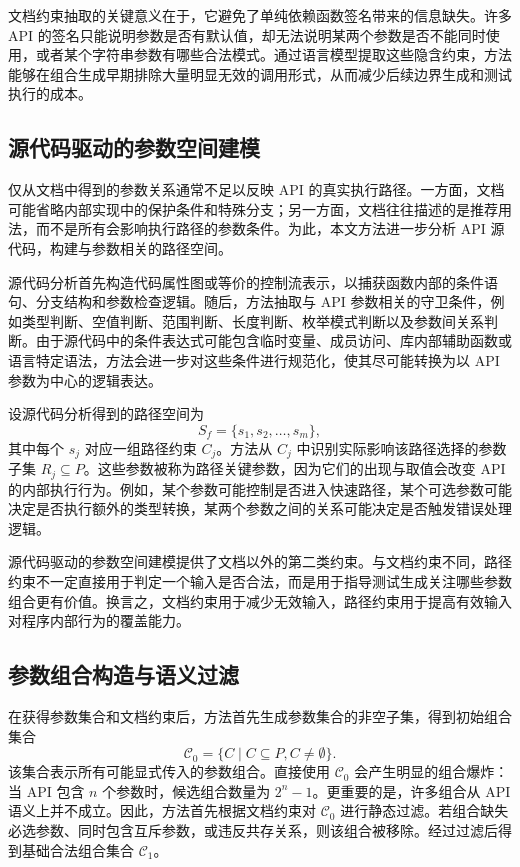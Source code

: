 \documentclass[UTF8,fontset=fandol]{ctexart}
\begin{document}
文档约束抽取的关键意义在于，它避免了单纯依赖函数签名带来的信息缺失。许多 API 的签名只能说明参数是否有默认值，却无法说明某两个参数是否不能同时使用，或者某个字符串参数有哪些合法模式。通过语言模型提取这些隐含约束，方法能够在组合生成早期排除大量明显无效的调用形式，从而减少后续边界生成和测试执行的成本。

\subsection{源代码驱动的参数空间建模}

仅从文档中得到的参数关系通常不足以反映 API 的真实执行路径。一方面，文档可能省略内部实现中的保护条件和特殊分支；另一方面，文档往往描述的是推荐用法，而不是所有会影响执行路径的参数条件。为此，本文方法进一步分析 API 源代码，构建与参数相关的路径空间。

源代码分析首先构造代码属性图或等价的控制流表示，以捕获函数内部的条件语句、分支结构和参数检查逻辑。随后，方法抽取与 API 参数相关的守卫条件，例如类型判断、空值判断、范围判断、长度判断、枚举模式判断以及参数间关系判断。由于源代码中的条件表达式可能包含临时变量、成员访问、库内部辅助函数或语言特定语法，方法会进一步对这些条件进行规范化，使其尽可能转换为以 API 参数为中心的逻辑表达。

设源代码分析得到的路径空间为
\[
S_f=\{s_1,s_2,\ldots,s_m\},
\]
其中每个 $s_j$ 对应一组路径约束 $C_j$。方法从 $C_j$ 中识别实际影响该路径选择的参数子集 $R_j \subseteq P$。这些参数被称为路径关键参数，因为它们的出现与取值会改变 API 的内部执行行为。例如，某个参数可能控制是否进入快速路径，某个可选参数可能决定是否执行额外的类型转换，某两个参数之间的关系可能决定是否触发错误处理逻辑。

源代码驱动的参数空间建模提供了文档以外的第二类约束。与文档约束不同，路径约束不一定直接用于判定一个输入是否合法，而是用于指导测试生成关注哪些参数组合更有价值。换言之，文档约束用于减少无效输入，路径约束用于提高有效输入对程序内部行为的覆盖能力。

\subsection{参数组合构造与语义过滤}

在获得参数集合和文档约束后，方法首先生成参数集合的非空子集，得到初始组合集合
\[
\mathcal{C}_0=\{C \mid C \subseteq P, C \neq \emptyset\}.
\]
该集合表示所有可能显式传入的参数组合。直接使用 $\mathcal{C}_0$ 会产生明显的组合爆炸：当 API 包含 $n$ 个参数时，候选组合数量为 $2^n-1$。更重要的是，许多组合从 API 语义上并不成立。因此，方法首先根据文档约束对 $\mathcal{C}_0$ 进行静态过滤。若组合缺失必选参数、同时包含互斥参数，或违反共存关系，则该组合被移除。经过过滤后得到基础合法组合集合 $\mathcal{C}_1$。
\end{document}
